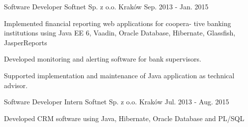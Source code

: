 \begin{cventries}
  \cventry
    {Software Developer} %
    {Softnet Sp. z o.o.} %
    {Kraków} %
    {Sep. 2013 - Jan. 2015} %
    {
      \begin{cvitems} %
       \item {Implemented financial reporting web applications for coopera-
tive banking institutions using Java EE 6, Vaadin, Oracle Database, Hibernate, Glassfish, JasperReports}
	  \item {Developed monitoring and alerting software for bank supervisors.} 
	  \item {Supported implementation and maintenance of Java application as technical advisor.}
      \end{cvitems}
    }
  \cventry
    {Software Developer Intern} %
    {Softnet Sp. z o.o.} %
    {Kraków} %
    {Jul. 2013 - Aug. 2015} %
    {
      \begin{cvitems} %
       \item {Developed CRM software using Java, Hibernate, Oracle Database and PL/SQL}
      \end{cvitems}
    }
\end{cventries}
